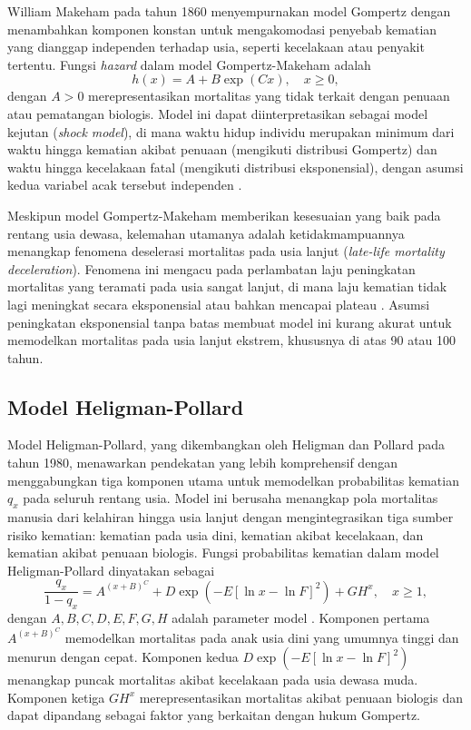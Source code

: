 William Makeham pada tahun 1860 menyempurnakan model Gompertz dengan menambahkan komponen konstan untuk mengakomodasi penyebab kematian yang dianggap independen terhadap usia, seperti kecelakaan atau penyakit tertentu. Fungsi \textit{hazard} dalam model Gompertz-Makeham adalah
\begin{equation}
    h(x) = A + B \exp(Cx), \quad x \geq 0,
\end{equation}
dengan $A > 0$ merepresentasikan mortalitas yang tidak terkait dengan penuaan atau pematangan biologis. Model ini dapat diinterpretasikan sebagai model kejutan (\textit{shock model}), di mana waktu hidup individu merupakan minimum dari waktu hingga kematian akibat penuaan (mengikuti distribusi Gompertz) dan waktu hingga kecelakaan fatal (mengikuti distribusi eksponensial), dengan asumsi kedua variabel acak tersebut independen \citep{makeham1860law, bower1997graduation}.

Meskipun model Gompertz-Makeham memberikan kesesuaian yang baik pada rentang usia dewasa, kelemahan utamanya adalah ketidakmampuannya menangkap fenomena deselerasi mortalitas pada usia lanjut (\textit{late-life mortality deceleration}). Fenomena ini mengacu pada perlambatan laju peningkatan mortalitas yang teramati pada usia sangat lanjut, di mana laju kematian tidak lagi meningkat secara eksponensial atau bahkan mencapai plateau \citep{barbi2018plateau, gavrilov2005mortality}. Asumsi peningkatan eksponensial tanpa batas membuat model ini kurang akurat untuk memodelkan mortalitas pada usia lanjut ekstrem, khususnya di atas 90 atau 100 tahun.

\subsection{Model Heligman-Pollard}

Model Heligman-Pollard, yang dikembangkan oleh Heligman dan Pollard pada tahun 1980, menawarkan pendekatan yang lebih komprehensif dengan menggabungkan tiga komponen utama untuk memodelkan probabilitas kematian $q_x$ pada seluruh rentang usia. Model ini berusaha menangkap pola mortalitas manusia dari kelahiran hingga usia lanjut dengan mengintegrasikan tiga sumber risiko kematian: kematian pada usia dini, kematian akibat kecelakaan, dan kematian akibat penuaan biologis. Fungsi probabilitas kematian dalam model Heligman-Pollard dinyatakan sebagai
\begin{equation}
    \frac{q_x}{1 - q_x} = A^{(x+B)^C} + D \exp\left(-E[\ln x - \ln F]^2\right) + GH^x, \quad x \geq 1,
\end{equation}
dengan $A, B, C, D, E, F, G, H$ adalah parameter model \citep{heligman1980age}. Komponen pertama $A^{(x+B)^C}$ memodelkan mortalitas pada anak usia dini yang umumnya tinggi dan menurun dengan cepat. Komponen kedua $D \exp\left(-E[\ln x - \ln F]^2\right)$ menangkap puncak mortalitas akibat kecelakaan pada usia dewasa muda. Komponen ketiga $GH^x$ merepresentasikan mortalitas akibat penuaan biologis dan dapat dipandang sebagai faktor yang berkaitan dengan hukum Gompertz.

